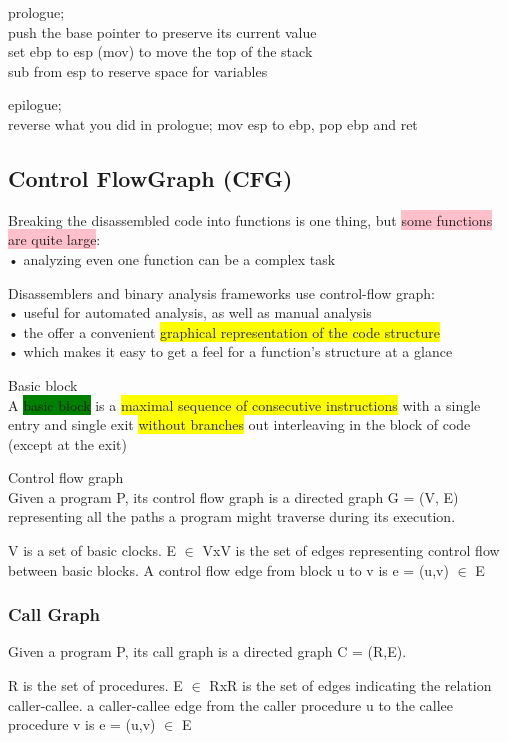 \documentclass[]{project_plan}
\begin{document}
prologue;\\
push the base pointer to preserve its current value\\
set ebp to esp (mov) to move the top of the stack\\
sub from esp to reserve space for variables

epilogue;\\
reverse what you did in prologue; mov esp to ebp, pop ebp and ret

\subsection{Control FlowGraph (CFG)}

Breaking the disassembled code into functions is one thing, but \colorbox{pink}{some functions are
  quite large}:\\
• analyzing even one function can be a complex task

Disassemblers and binary analysis frameworks use control-flow graph:\\
• useful for automated analysis, as well as manual analysis\\
• the offer a convenient \colorbox{yellow}{graphical representation of the code structure}\\
• which makes it easy to get a feel for a function’s structure at a glance

Basic block\\
A \colorbox{green}{basic block} is a \colorbox{yellow}{maximal sequence of consecutive instructions} with a single
entry and single exit \colorbox{yellow}{without branches} out interleaving in the block of code
(except at the exit)

Control flow graph\\
Given a program P, its control flow graph is a directed graph G = (V, E)
representing all the paths a program might traverse during its execution.

V is a set of basic clocks. E $\in$ VxV is the set of edges representing control flow between basic blocks. A control flow edge from block u to v is e = (u,v) $\in$ E

\subsubsection{Call Graph}

Given a program P, its call graph is a directed graph C = (R,E).

R is the set of procedures. E $\in$ RxR is the set of edges indicating the relation caller-callee. a caller-callee edge from the caller procedure u to the callee procedure v is e = (u,v) $\in$ E
\end{document}
